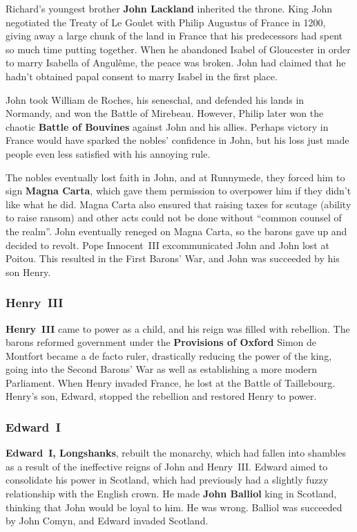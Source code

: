 Richard's youngest brother \textbf{John Lackland} inherited the throne.
King John negotiated the Treaty of Le Goulet with Philip Augustus of France in 1200,
giving away a large chunk of the land in France that his predecessors had spent so much time putting together.
When he abandoned Isabel of Gloucester in order to marry Isabella of Angul\^eme, the peace was broken.
John had claimed that he hadn't obtained papal consent to marry Isabel in the first place.

John took William de Roches, his seneschal, and defended his lands in Normandy, and won the Battle of Mirebeau.
However, Philip later won the chaotic \textbf{Battle of Bouvines} against John and his allies.
Perhaps victory in France would have sparked the nobles' confidence in John,
but his loss just made people even less satisfied with his annoying rule.

The nobles eventually lost faith in John, and at Runnymede, they forced him to sign \textbf{Magna Carta},
which gave them permission to overpower him if they didn't like what he did.
Magna Carta also ensured that raising taxes for scutage (ability to raise ransom)
and other acts could not be done without ``common counsel of the realm''.
John eventually reneged on Magna Carta, so the barons gave up and decided to revolt.
Pope Innocent~III excommunicated John and John lost at Poitou.
This resulted in the First Barons' War, and John was succeeded by his son Henry.

\subsubsection*{Henry~III}

\textbf{Henry~III} came to power as a child, and his reign was filled with rebellion.
The barons reformed government under the \textbf{Provisions of Oxford}
Simon de Montfort became a de facto ruler, drastically reducing the power of the king,
going into the Second Barons' War as well as establishing a more modern Parliament.
When Henry invaded France, he lost at the Battle of Taillebourg.
Henry's son, Edward, stopped the rebellion and restored Henry to power.

\subsubsection*{Edward~I}

\textbf{Edward~I, Longshanks}, rebuilt the monarchy,
which had fallen into shambles as a result of the ineffective reigns of John and Henry~III\@.
Edward aimed to consolidate his power in Scotland,
which had previously had a slightly fuzzy relationship with the English crown.
He made \textbf{John Balliol} king in Scotland, thinking that John would be loyal to him.
He was wrong.
Balliol was succeeded by John Comyn, and Edward invaded Scotland.

